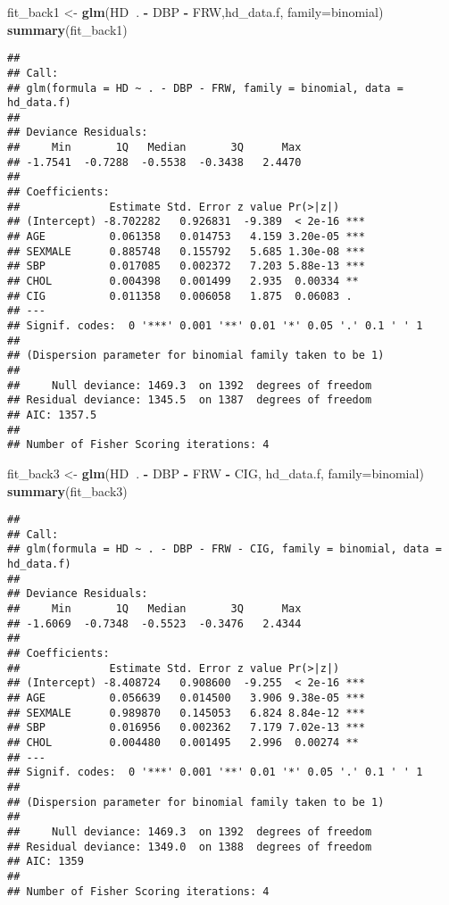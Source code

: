 \documentclass[]{article}
\newenvironment{Shaded}{\begin{snugshade}}{\end{snugshade}}
\newcommand{\KeywordTok}[1]{\textcolor[rgb]{0.13,0.29,0.53}{\textbf{#1}}}
\newcommand{\DataTypeTok}[1]{\textcolor[rgb]{0.13,0.29,0.53}{#1}}
\newcommand{\StringTok}[1]{\textcolor[rgb]{0.31,0.60,0.02}{#1}}
\newcommand{\OperatorTok}[1]{\textcolor[rgb]{0.81,0.36,0.00}{\textbf{#1}}}
\newcommand{\NormalTok}[1]{#1}
\begin{document}
\begin{Shaded}
\begin{Highlighting}[]
\NormalTok{fit_back1 <-}\StringTok{ }\KeywordTok{glm}\NormalTok{(HD}\OperatorTok{~}\NormalTok{. }\OperatorTok{-}\StringTok{ }\NormalTok{DBP }\OperatorTok{-}\StringTok{ }\NormalTok{FRW,hd_data.f, }\DataTypeTok{family=}\NormalTok{binomial)}
\KeywordTok{summary}\NormalTok{(fit_back1)}
\end{Highlighting}
\end{Shaded}

\begin{verbatim}
## 
## Call:
## glm(formula = HD ~ . - DBP - FRW, family = binomial, data = hd_data.f)
## 
## Deviance Residuals: 
##     Min       1Q   Median       3Q      Max  
## -1.7541  -0.7288  -0.5538  -0.3438   2.4470  
## 
## Coefficients:
##              Estimate Std. Error z value Pr(>|z|)    
## (Intercept) -8.702282   0.926831  -9.389  < 2e-16 ***
## AGE          0.061358   0.014753   4.159 3.20e-05 ***
## SEXMALE      0.885748   0.155792   5.685 1.30e-08 ***
## SBP          0.017085   0.002372   7.203 5.88e-13 ***
## CHOL         0.004398   0.001499   2.935  0.00334 ** 
## CIG          0.011358   0.006058   1.875  0.06083 .  
## ---
## Signif. codes:  0 '***' 0.001 '**' 0.01 '*' 0.05 '.' 0.1 ' ' 1
## 
## (Dispersion parameter for binomial family taken to be 1)
## 
##     Null deviance: 1469.3  on 1392  degrees of freedom
## Residual deviance: 1345.5  on 1387  degrees of freedom
## AIC: 1357.5
## 
## Number of Fisher Scoring iterations: 4
\end{verbatim}

\begin{Shaded}
\begin{Highlighting}[]
\NormalTok{fit_back3 <-}\StringTok{ }\KeywordTok{glm}\NormalTok{(HD}\OperatorTok{~}\NormalTok{. }\OperatorTok{-}\StringTok{ }\NormalTok{DBP }\OperatorTok{-}\StringTok{ }\NormalTok{FRW }\OperatorTok{-}\StringTok{ }\NormalTok{CIG, hd_data.f, }\DataTypeTok{family=}\NormalTok{binomial)}
\KeywordTok{summary}\NormalTok{(fit_back3)}
\end{Highlighting}
\end{Shaded}

\begin{verbatim}
## 
## Call:
## glm(formula = HD ~ . - DBP - FRW - CIG, family = binomial, data = hd_data.f)
## 
## Deviance Residuals: 
##     Min       1Q   Median       3Q      Max  
## -1.6069  -0.7348  -0.5523  -0.3476   2.4344  
## 
## Coefficients:
##              Estimate Std. Error z value Pr(>|z|)    
## (Intercept) -8.408724   0.908600  -9.255  < 2e-16 ***
## AGE          0.056639   0.014500   3.906 9.38e-05 ***
## SEXMALE      0.989870   0.145053   6.824 8.84e-12 ***
## SBP          0.016956   0.002362   7.179 7.02e-13 ***
## CHOL         0.004480   0.001495   2.996  0.00274 ** 
## ---
## Signif. codes:  0 '***' 0.001 '**' 0.01 '*' 0.05 '.' 0.1 ' ' 1
## 
## (Dispersion parameter for binomial family taken to be 1)
## 
##     Null deviance: 1469.3  on 1392  degrees of freedom
## Residual deviance: 1349.0  on 1388  degrees of freedom
## AIC: 1359
## 
## Number of Fisher Scoring iterations: 4
\end{verbatim}
\end{document}
